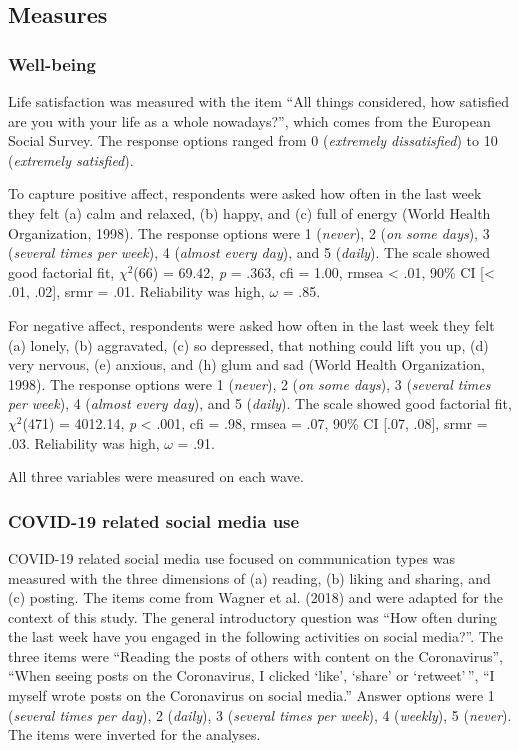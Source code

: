 \documentclass[
  man,mask,floatsintext]{apa7}
\begin{document}
\subsection{Measures}\label{measures}

\subsubsection{Well-being}\label{well-being}

Life satisfaction was measured with the item ``All things considered, how satisfied are you with your life as a whole nowadays?'', which comes from the European Social Survey.
The response options ranged from 0 (\emph{extremely dissatisfied}) to 10 (\emph{extremely satisfied}).

To capture positive affect, respondents were asked how often in the last week they felt (a) calm and relaxed, (b) happy, and (c) full of energy (World Health Organization, 1998).
The response options were 1 (\emph{never}), 2 (\emph{on some days}), 3 (\emph{several times per week}), 4 (\emph{almost every day}), and 5 (\emph{daily}).
The scale showed good factorial fit, \(\chi^2\)(66) = 69.42, \textit{p} = .363, cfi = 1.00, rmsea \textless{} .01, 90\% CI {[}\textless{} .01, .02{]}, srmr = .01.
Reliability was high, \(\omega\) = .85.

For negative affect, respondents were asked how often in the last week they felt (a) lonely, (b) aggravated, (c) so depressed, that nothing could lift you up, (d) very nervous, (e) anxious, and (h) glum and sad (World Health Organization, 1998).
The response options were 1 (\emph{never}), 2 (\emph{on some days}), 3 (\emph{several times per week}), 4 (\emph{almost every day}), and 5 (\emph{daily}).
The scale showed good factorial fit, \(\chi^2\)(471) = 4012.14, \textit{p} \textless{} .001, cfi = .98, rmsea = .07, 90\% CI {[}.07, .08{]}, srmr = .03.
Reliability was high, \(\omega\) = .91.

All three variables were measured on each wave.

\subsubsection{COVID-19 related social media use}\label{covid-19-related-social-media-use}

COVID-19 related social media use focused on communication types was measured with the three dimensions of (a) reading, (b) liking and sharing, and (c) posting.
The items come from Wagner et al. (2018) and were adapted for the context of this study.
The general introductory question was ``How often during the last week have you engaged in the following activities on social media?''.
The three items were ``Reading the posts of others with content on the Coronavirus'', ``When seeing posts on the Coronavirus, I clicked `like', `share' or `retweet'\,'', ``I myself wrote posts on the Coronavirus on social media.''
Answer options were 1 (\emph{several times per day}), 2 (\emph{daily}), 3 (\emph{several times per week}), 4 (\emph{weekly}), 5 (\emph{never}).
The items were inverted for the analyses.
\end{document}
